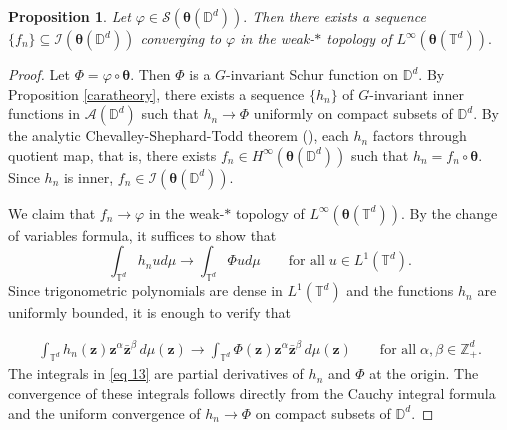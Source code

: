 \documentclass[12pt,reqno]{amsart}
\newtheorem{proposition}[theorem]{Proposition}%
\theoremstyle{remark}
\theoremstyle{definition}
\newcommand{\beq}{\begin{eqnarray}}
\newcommand{\eeq}{\end{eqnarray}}
\begin{document}
\begin{proposition}\label{weak*}
    Let  $\varphi\in \mathcal{S}(\boldsymbol \theta(\mathbb D^d)).$ Then there exists a sequence  $\{f_n\}\subseteq \mathcal{I}(\boldsymbol \theta(\mathbb D^d))$ converging to $\varphi$ in the weak-$*$ topology of $L^\infty(\boldsymbol \theta(\mathbb T^d)).$ 
\end{proposition}
\begin{proof}
    Let $\Phi=\varphi \circ \boldsymbol\theta.$ Then $\Phi$ is a $G$-invariant Schur function on $\mathbb D^d.$ By Proposition \ref{caratheory}, there exists a sequence $\{h_n\}$ of $G$-invariant inner functions in $\mathcal{A}(\mathbb D^d)$ such that $h_n \to \Phi$ uniformly on compact subsets of $\mathbb D^d.$ 
    By the analytic Chevalley-Shephard-Todd theorem (\cite[Theorem 3.1]{BDGR2022}), each $h_n$ factors through quotient map, that is, there exists $f_n\in H^\infty(\boldsymbol \theta(\mathbb D^d))$ such that $h_n =f_n \circ \boldsymbol \theta.$ 
    Since $h_n$ is inner, $f_n \in \mathcal{I}(\boldsymbol \theta(\mathbb D^d)).$
   
    We claim that $f_n\to \varphi$ in the weak-$*$ topology of $L^\infty(\boldsymbol \theta(\mathbb T^d)).$
    By the change of variables formula, it suffices to show that
    $$ \int_{\mathbb T^d} h_n u d\mu \to \int_{\mathbb T^d} \Phi u d\mu \qquad \text{for all}\; u \in L^1(\mathbb T^d).$$
    Since trigonometric polynomials are dense in $L^1(\mathbb T^d)$ and the functions $h_n$ are uniformly bounded, it is enough to verify that

    \beq \label{eq 13}  \int_{\mathbb{T}^d} h_n(\boldsymbol{z}) \boldsymbol{z}^\alpha \bar{\boldsymbol{z}}^\beta \, d\mu(\boldsymbol{z}) \to \int_{\mathbb{T}^d} \Phi(\boldsymbol{z}) \boldsymbol{z}^\alpha \bar{\boldsymbol{z}}^\beta \, d\mu(\boldsymbol{z}) \qquad \text{for all}\; \alpha , \beta \in \mathbb Z_+^d.\eeq
    The integrals in \eqref{eq 13} are partial derivatives of $h_n$ and $\Phi$ at the origin. The convergence of these integrals follows directly from the Cauchy integral formula and the uniform convergence of $h_n \to \Phi$ on compact subsets of $\mathbb{D}^d$.
    \end{proof} 
    
\end{document}
